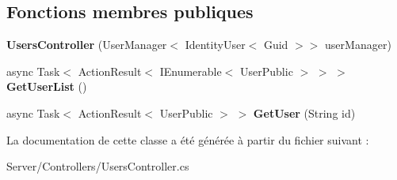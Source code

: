 \subsection*{Fonctions membres publiques}
\begin{DoxyCompactItemize}
\item 
\mbox{\label{class_mediwatch_1_1_server_1_1_controllers_1_1_users_controller_aa150b9ceff5e45229a24c07a369bc84d}} 
{\bfseries Users\+Controller} (User\+Manager$<$ Identity\+User$<$ Guid $>$$>$ user\+Manager)
\item 
\mbox{\label{class_mediwatch_1_1_server_1_1_controllers_1_1_users_controller_a5b525adc63d36869bde5021b82480228}} 
async Task$<$ Action\+Result$<$ I\+Enumerable$<$ User\+Public $>$ $>$ $>$ {\bfseries Get\+User\+List} ()
\item 
\mbox{\label{class_mediwatch_1_1_server_1_1_controllers_1_1_users_controller_a27103389ca1c6c33d21a3dc3212d7b08}} 
async Task$<$ Action\+Result$<$ User\+Public $>$ $>$ {\bfseries Get\+User} (String id)
\end{DoxyCompactItemize}


La documentation de cette classe a été générée à partir du fichier suivant \+:\begin{DoxyCompactItemize}
\item 
Server/\+Controllers/Users\+Controller.\+cs\end{DoxyCompactItemize}
